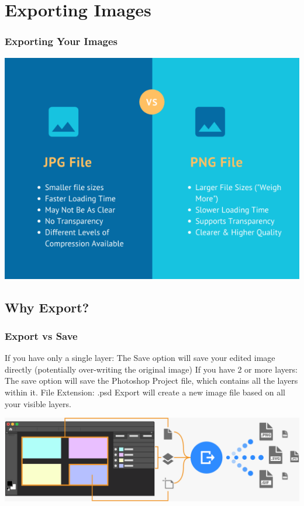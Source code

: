 \documentclass{beamer}
\begin{document}
	\section{Exporting Images}	
	\begin{frame}
		\frametitle{Exporting Your Images}
		\begin{center}
			\includegraphics[width=1.0\textwidth]{images/jpg-vs-png-comparison-chart-resized-1.png}
		\end{center}
	\end{frame}
	
	\subsection{Why Export?}
	\begin{frame}
		\frametitle{Export vs Save}
		\begin{outline}
			\1 If you have only a single layer:
			\2 The Save option will save your edited image directly (potentially over-writing the original image)
			\1 If you have 2 or more layers:
			\2 The save option will save the Photoshop Project file, which contains all the layers within it.
			\3 File Extension:  .psd
			\1 Export will create a new image file based on all your visible layers.
		\end{outline}
		\begin{center}
			\includegraphics[width = 1.0\textwidth]{images/exporting.png}
		\end{center}
	\end{frame}
\end{document}
